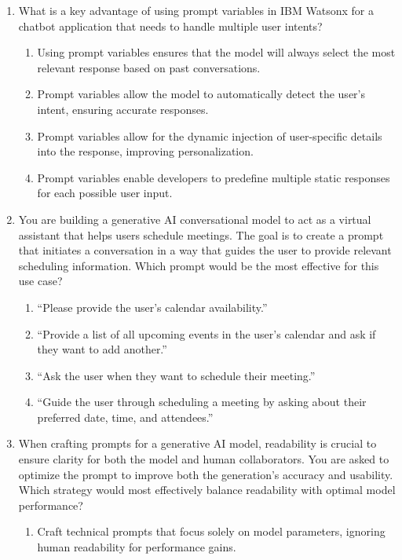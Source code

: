 \begin{enumerate}[leftmargin=*]
\item What is a key advantage of using prompt variables in IBM Watsonx for a chatbot application that needs to handle multiple user intents?
\begin{enumerate}[label=\Alph*.]
  \item Using prompt variables ensures that the model will always select the most relevant response based on past conversations.
  \item Prompt variables allow the model to automatically detect the user's intent, ensuring accurate responses.
  \item Prompt variables allow for the dynamic injection of user-specific details into the response, improving personalization.
  \item Prompt variables enable developers to predefine multiple static responses for each possible user input.
\end{enumerate}
\item You are building a generative AI conversational model to act as a virtual assistant that helps users schedule meetings. The goal is to create a prompt that initiates a conversation in a way that guides the user to provide relevant scheduling information. Which prompt would be the most effective for this use case?
\begin{enumerate}[label=\Alph*.]
  \item ``Please provide the user's calendar availability.''
  \item ``Provide a list of all upcoming events in the user's calendar and ask if they want to add another.''
  \item ``Ask the user when they want to schedule their meeting.''
  \item ``Guide the user through scheduling a meeting by asking about their preferred date, time, and attendees.''
\end{enumerate}
\item When crafting prompts for a generative AI model, readability is crucial to ensure clarity for both the model and human collaborators. You are asked to optimize the prompt to improve both the generation's accuracy and usability. Which strategy would most effectively balance readability with optimal model performance?
\begin{enumerate}[label=\Alph*.]
  \item Craft technical prompts that focus solely on model parameters, ignoring human readability for performance gains.

\end{enumerate}
\end{enumerate}
